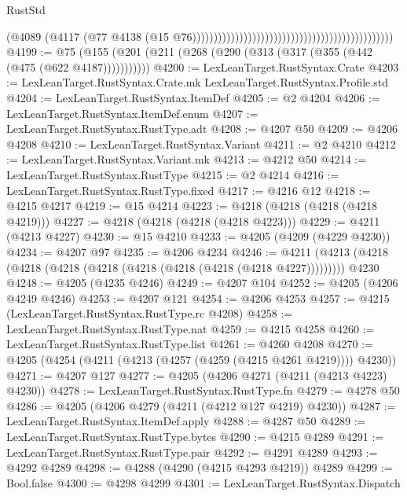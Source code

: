 \begin{lexlean}{RustStd}
\begin{coremodule}
                                                                                          (@4089
                                                                                            (@4117
                                                                                              (@77
                                                                                                @4138
                                                                                                (@15
                                                                                                  @76)))))))))))))))))))))))))))))))))))))))))))))))
@4199 := @75 (@155 (@201 (@211 (@268 (@290 (@313 (@317 (@355 (@442 (@475 (@622 @4187)))))))))))
@4200 := LexLeanTarget.RustSyntax.Crate
@4203 := LexLeanTarget.RustSyntax.Crate.mk LexLeanTarget.RustSyntax.Profile.std
@4204 := LexLeanTarget.RustSyntax.ItemDef
@4205 := @2 @4204
@4206 := LexLeanTarget.RustSyntax.ItemDef.enum
@4207 := LexLeanTarget.RustSyntax.RustType.adt
@4208 := @4207 @50
@4209 := @4206 @4208
@4210 := LexLeanTarget.RustSyntax.Variant
@4211 := @2 @4210
@4212 := LexLeanTarget.RustSyntax.Variant.mk
@4213 := @4212 @50
@4214 := LexLeanTarget.RustSyntax.RustType
@4215 := @2 @4214
@4216 := LexLeanTarget.RustSyntax.RustType.fixed
@4217 := @4216 @12
@4218 := @4215 @4217
@4219 := @15 @4214
@4223 := @4218 (@4218 (@4218 (@4218 @4219)))
@4227 := @4218 (@4218 (@4218 (@4218 @4223)))
@4229 := @4211 (@4213 @4227)
@4230 := @15 @4210
@4233 := @4205 (@4209 (@4229 @4230))
@4234 := @4207 @97
@4235 := @4206 @4234
@4246 := @4211 (@4213 (@4218 (@4218 (@4218 (@4218 (@4218 (@4218 (@4218 (@4218 @4227))))))))) @4230
@4248 := @4205 (@4235 @4246)
@4249 := @4207 @104
@4252 := @4205 (@4206 @4249 @4246)
@4253 := @4207 @121
@4254 := @4206 @4253
@4257 := @4215 (LexLeanTarget.RustSyntax.RustType.rc @4208)
@4258 := LexLeanTarget.RustSyntax.RustType.nat
@4259 := @4215 @4258
@4260 := LexLeanTarget.RustSyntax.RustType.list
@4261 := @4260 @4208
@4270 := @4205 (@4254 (@4211 (@4213 (@4257 (@4259 (@4215 @4261 @4219)))) @4230))
@4271 := @4207 @127
@4277 := @4205 (@4206 @4271 (@4211 (@4213 @4223) @4230))
@4278 := LexLeanTarget.RustSyntax.RustType.fn
@4279 := @4278 @50
@4286 := @4205 (@4206 @4279 (@4211 (@4212 @127 @4219) @4230))
@4287 := LexLeanTarget.RustSyntax.ItemDef.apply
@4288 := @4287 @50
@4289 := LexLeanTarget.RustSyntax.RustType.bytes
@4290 := @4215 @4289
@4291 := LexLeanTarget.RustSyntax.RustType.pair
@4292 := @4291 @4289
@4293 := @4292 @4289
@4298 := @4288 (@4290 (@4215 @4293 @4219)) @4289
@4299 := Bool.false
@4300 := @4298 @4299
@4301 := LexLeanTarget.RustSyntax.Dispatch

\end{coremodule}
\end{lexlean}
